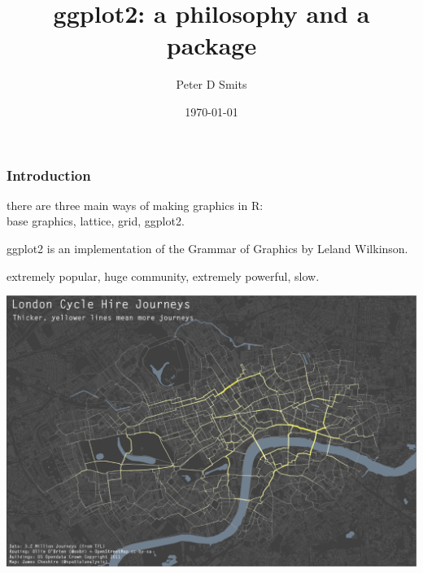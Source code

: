 \documentclass{beamer}\usepackage{graphicx, color}
\title{ggplot2: a philosophy and a package}
\author{Peter D Smits}
\institute{Committee on Evolutionary Biology \\
University of Chicago}
\date{\today}
\begin{document}
\begin{frame}
  \maketitle
\end{frame}

\begin{frame}
  \frametitle{Introduction}

  there are three main ways of making graphics in R:\\
  base graphics, lattice, grid, ggplot2.

  ggplot2 is an implementation of the Grammar of Graphics by Leland Wilkinson.

  extremely popular, huge community, extremely powerful, slow.

\end{frame}

\begin{frame}
  \includegraphics[width = \textwidth, keepaspectratio = true]{figure/bike_ggplot}

\end{frame}
\end{document}
